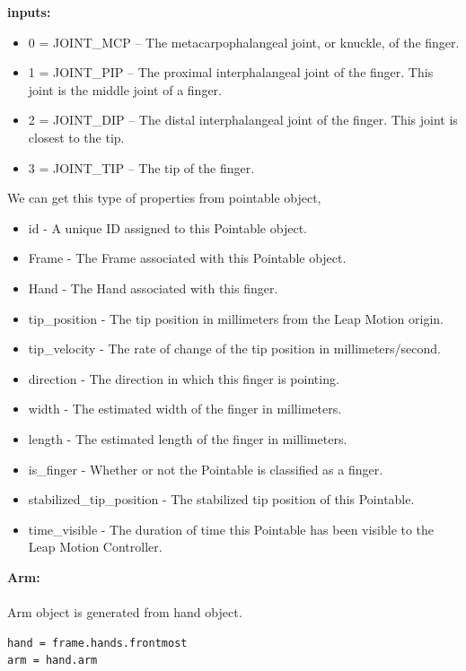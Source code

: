 \documentclass[11pt,a4paper]{article}
\newcommand\tab[1][1cm]{\hspace*{#1}}
\begin{document}
\textbf{inputs:}
\begin{itemize}
    \item 0 = JOINT\_MCP – The metacarpophalangeal joint, or knuckle, of the finger.
    \item 1 = JOINT\_PIP – The proximal interphalangeal joint of the finger. This joint is the middle joint of a finger.
    \item 2 = JOINT\_DIP – The distal interphalangeal joint of the finger. This joint is closest to the tip.
    \item 3 = JOINT\_TIP – The tip of the finger.
\end{itemize}
\vspace{1cm}
We can get this type of properties from pointable object,
\begin{itemize}
    \item id  -  A unique ID assigned to this Pointable object.
    \item Frame - The Frame associated with this Pointable object.
    \item Hand - The Hand associated with this finger.
    \item tip\_position - The tip position in millimeters from the Leap Motion origin.
    \item tip\_velocity - The rate of change of the tip position in millimeters/second.
    \item direction - The direction in which this finger is pointing.
    \item width - The estimated width of the finger in millimeters.
    \item length - The estimated length of the finger in millimeters.
    \item is\_finger - Whether or not the Pointable is classified as a finger.
    \item stabilized\_tip\_position - The stabilized tip position of this Pointable.
    \item time\_visible - The duration of time this Pointable has been visible to the Leap Motion Controller.
\end{itemize}
\vspace{2cm}
    \textbf{\Large{Arm:}}
	\vspace{0.5cm}\\
	\tab{There is also an arm object which gives data related elbow\_position, arm.wrist\_position, width, direction, the basis of all three axises.}\\
	\vspace{.5cm}
	Arm object is generated from hand object.
	\begin{lstlisting}
hand = frame.hands.frontmost
arm = hand.arm
\end{lstlisting}
\vspace{1cm}
\end{document}
